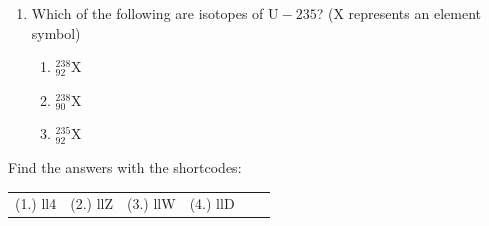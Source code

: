 \begin{enumerate}[noitemsep, label=\textbf{\arabic*}. ]
\begin{enumerate}[noitemsep, label=\textbf{\alph*}. ]
\end{enumerate}
                \label{m38753*uid64}\item Which of the following are isotopes of $\mathrm{U-}235$? (X represents an element symbol)
\label{m38753*id258452}\begin{enumerate}[noitemsep, label=\textbf{\alph*}. ] 
            \label{m38753*uid65}\item $_{92}^{238}\mathrm{X}$
\label{m38753*uid66}\item $_{90}^{238}\mathrm{X}$
\label{m38753*uid67}\item $_{92}^{235}\mathrm{X}$
\end{enumerate}
                \end{enumerate}
      \label{m38753*uid68}
\par {} Find the answers with the shortcodes:
 \par \begin{tabular}[h]{cccccc}
 (1.) ll4  &  (2.) llZ  &  (3.) llW  &  (4.) llD  & \end{tabular}

